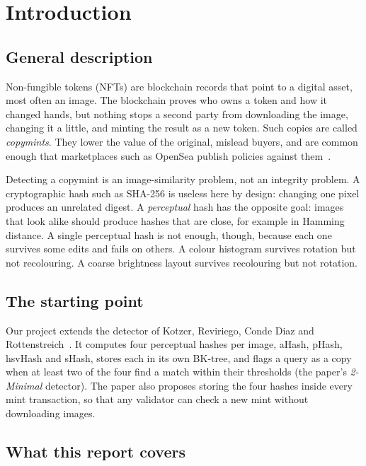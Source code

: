\section{Introduction}

\subsection{General description}

Non-fungible tokens (NFTs) are blockchain records that point to a digital asset, most often
an image. The blockchain proves who owns a token and how it changed hands, but nothing stops
a second party from downloading the image, changing it a little, and minting the result as
a new token. Such copies are called \emph{copymints}. They lower the value of the original,
mislead buyers, and are common enough that marketplaces such as OpenSea publish policies
against them~\cite{kotzer2025}.

Detecting a copymint is an image-similarity problem, not an integrity problem.
A cryptographic hash such as SHA-256 is useless here by design: changing one pixel produces
an unrelated digest. A \emph{perceptual} hash has the opposite goal: images that look alike
should produce hashes that are close, for example in Hamming distance. A single perceptual
hash is not enough, though, because each one survives some edits and fails on others. A
colour histogram survives rotation but not recolouring. A coarse brightness layout survives
recolouring but not rotation.

\subsection{The starting point}

Our project extends the detector of Kotzer, Reviriego, Conde Diaz and
Rottenstreich~\cite{kotzer2025,kotzer2024}. It computes four perceptual hashes per image,
aHash, pHash, hsvHash and sHash, stores each in its own BK-tree, and flags a query as a copy
when at least two of the four find a match within their thresholds (the paper's
\emph{2-Minimal} detector). The paper also proposes storing the four hashes inside every
mint transaction, so that any validator can check a new mint without downloading images.

\subsection{What this report covers}

